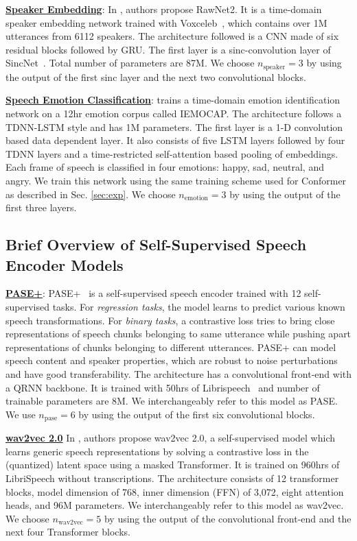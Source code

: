 \documentclass{article}
\begin{document}
\underline{\textbf{Speaker Embedding}}: In \cite{jung2020improved}, authors propose RawNet2.
It is a time-domain speaker embedding network trained with Voxceleb~\cite{jung2020improved}, which contains over 1M utterances from 6112 speakers.
The architecture
followed is a \ac{CNN} made of six residual blocks followed by \ac{GRU}.
The first layer is a sinc-convolution layer of SincNet~\cite{ravanelli2018speaker}.
Total number of parameters are 87M.
We choose $n_\text{speaker}=3$ by using the output of the first sinc layer and the next two convolutional blocks.

\underline{\textbf{Speech Emotion Classification}}: \cite{sarma2018emotion} trains a time-domain emotion identification network on a 12hr emotion corpus called IEMOCAP.
The architecture follows a \ac{TDNN}-LSTM style and has 1M parameters.
The first layer is a 1-D convolution based data dependent layer.
It also consists of five LSTM layers followed by four \ac{TDNN} layers and a time-restricted self-attention based pooling of embeddings.
Each frame of speech is classified in four emotions: happy, sad, neutral, and angry.
We train this network
using the same training scheme used for Conformer as described in Sec. \ref{sec:exp}.
We choose $n_{\text{emotion}}=3$ by using the output of the first three layers.


\subsection{Brief Overview of Self-Supervised Speech Encoder Models}
\underline{\textbf{PASE+}}: PASE+~\cite{ravanelli2020multi} is a self-supervised speech encoder trained with 12 self-supervised tasks.
For \emph{regression tasks}, the model learns to predict various known speech transformations.
For \emph{binary tasks}, a contrastive loss tries to bring close representations of speech chunks belonging to same utterance while pushing apart representations of chunks belonging to different utterances.
PASE+ can model speech content and speaker properties, which are robust to noise perturbations and have good transferability.
The architecture has a convolutional front-end with a \ac{QRNN} backbone.
It is trained with 50hrs of Librispeech~\cite{panayotov2015librispeech} and number of trainable parameters are 8M.
We interchangeably refer to this model as PASE.
We use $n_{\text{pase}}=6$ by using the output of the first six convolutional blocks.

\underline{\textbf{wav2vec 2.0}}
In \cite{baevski2020wav2vec}, authors propose wav2vec 2.0, a self-supervised model which learns generic speech representations by solving a contrastive loss in the (quantized) latent space using a masked Transformer.
It is trained on 960hrs of LibriSpeech without transcriptions.
The architecture
consists of 12 transformer blocks, model dimension of 768, inner dimension (\ac{FFN}) of 3,072, eight attention heads, and 96M parameters.
We interchangeably refer to this model as wav2vec.
We choose $n_{\text{wav2vec}}=5$ by using the output of the convolutional front-end and the next four Transformer blocks.
\end{document}
